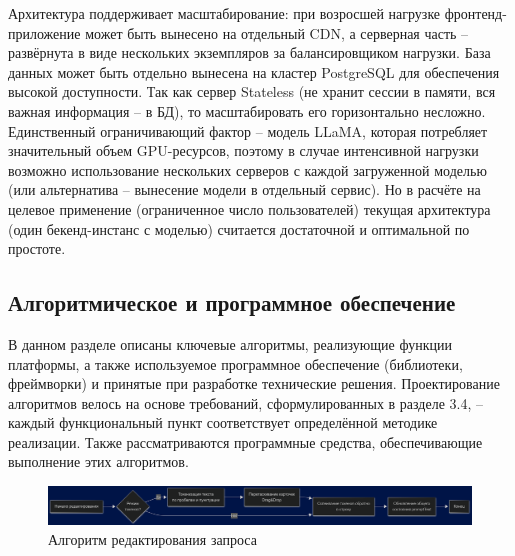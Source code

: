 Архитектура поддерживает масштабирование: при возросшей нагрузке фронтенд-приложение может быть вынесено на отдельный CDN, а серверная часть – развёрнута в виде нескольких экземпляров за балансировщиком нагрузки. База данных может быть отдельно вынесена на кластер PostgreSQL для обеспечения высокой доступности. Так как сервер Stateless (не хранит сессии в памяти, вся важная информация – в БД), то масштабировать его горизонтально несложно. Единственный ограничивающий фактор – модель LLaMA, которая потребляет значительный объем GPU-ресурсов, поэтому в случае интенсивной нагрузки возможно использование нескольких серверов с каждой загруженной моделью (или альтернатива – вынесение модели в отдельный сервис). Но в расчёте на целевое применение (ограниченное число пользователей) текущая архитектура (один бекенд-инстанс с моделью) считается достаточной и оптимальной по простоте.

\subsection{Алгоритмическое и программное обеспечение}
В данном разделе описаны ключевые алгоритмы, реализующие функции платформы, а также используемое программное обеспечение (библиотеки, фреймворки) и принятые при разработке технические решения. Проектирование алгоритмов велось на основе требований, сформулированных в разделе 3.4, – каждый функциональный пункт соответствует определённой методике реализации. Также рассматриваются программные средства, обеспечивающие выполнение этих алгоритмов.

\begin{figure}[htbp]
    \centering
    \includegraphics[width=1\textwidth]{picture/diploma-inter-algo-1.png}
    \caption{Алгоритм редактирования запроса}
    \label{algo-1}
\end{figure}

